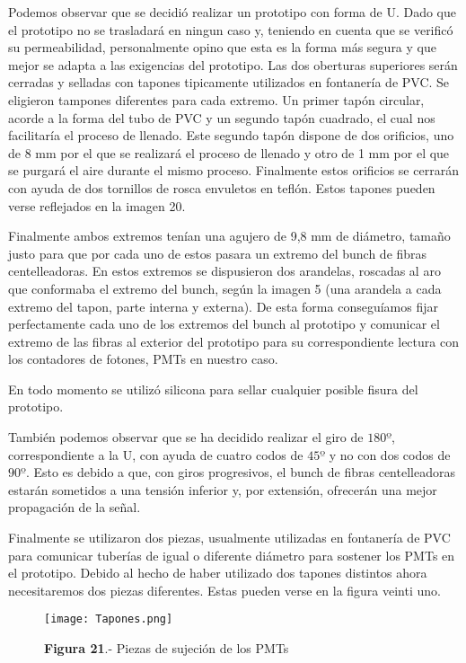 Podemos observar que se decidió realizar un prototipo con forma de U. Dado que el prototipo no se trasladará en ningun caso y, teniendo en cuenta que se verificó su permeabilidad, personalmente opino que esta es la forma más segura y que mejor se adapta a las exigencias del prototipo. Las dos oberturas superiores serán cerradas y selladas con tapones tipicamente utilizados en fontanería de PVC. Se eligieron tampones diferentes para cada extremo. Un primer tapón circular, acorde a la forma del tubo de PVC y un segundo tapón cuadrado, el cual nos facilitaría el proceso de llenado. Este segundo tapón dispone de dos orificios, uno de 8 mm por el que se realizará el proceso de llenado y otro de 1 mm por el que se purgará el aire durante el mismo proceso. Finalmente estos orificios se cerrarán con ayuda de dos tornillos de rosca envuletos en teflón. Estos tapones pueden verse reflejados en la imagen 20.

Finalmente ambos extremos tenían una agujero de 9,8 mm de diámetro, tamaño justo para que por cada uno de estos pasara un extremo del bunch de fibras centelleadoras. En estos extremos se dispusieron dos arandelas, roscadas al aro que conformaba el extremo del bunch, según la imagen 5 (una arandela a cada extremo del tapon, parte interna y externa). De esta forma conseguíamos fijar perfectamente cada uno de los extremos del bunch al prototipo y comunicar el extremo de las fibras al exterior del prototipo para su correspondiente lectura con los contadores de fotones, PMTs en nuestro caso. 

En todo momento se utilizó silicona para sellar cualquier posible fisura del prototipo.

También podemos observar que se ha decidido realizar el giro de $180º$, correspondiente a la U, con ayuda de cuatro codos de $45º$ y no con dos codos de $90º$. Esto es debido a que, con giros progresivos, el bunch de fibras centelleadoras estarán sometidos a una tensión inferior y, por extensión, ofrecerán una mejor propagación de la señal.

Finalmente se utilizaron dos piezas, usualmente utilizadas en fontanería de PVC para comunicar tuberías de igual o diferente diámetro para sostener los PMTs en el prototipo. Debido al hecho de haber utilizado dos tapones distintos ahora necesitaremos dos piezas diferentes. Estas pueden verse en la figura veinti uno.

\begin{figure}[hbtp]
\centering
\texttt{[image: Tapones.png]}
\caption{\textbf{Figura 21}.- Piezas de sujeción de los PMTs}
\end{figure}

